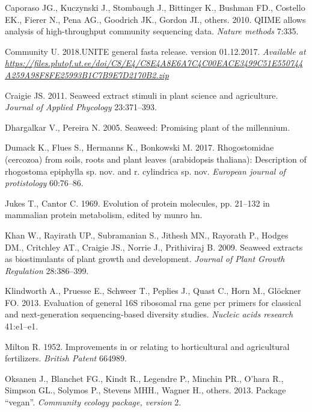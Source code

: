 \documentclass[11pt,]{article}
\begin{document}
\hypertarget{ref-caporaso2010qiime}{}
Caporaso JG., Kuczynski J., Stombaugh J., Bittinger K., Bushman FD.,
Costello EK., Fierer N., Pena AG., Goodrich JK., Gordon JI., others.
2010. QIIME allows analysis of high-throughput community sequencing
data. \emph{Nature methods} 7:335.

\hypertarget{ref-UNITE2017}{}
Community U. 2018.UNITE general fasta release. version 01.12.2017.
\emph{Available at}
\emph{\url{https://files.plutof.ut.ee/doi/C8/E4/C8E4A8E6A7C4C00EACE3499C51E550744A259A98F8FE25993B1C7B9E7D2170B2.zip}}

\hypertarget{ref-craigie2011seaweed}{}
Craigie JS. 2011. Seaweed extract stimuli in plant science and
agriculture. \emph{Journal of Applied Phycology} 23:371--393.

\hypertarget{ref-dhargalkar2005seaweed}{}
Dhargalkar V., Pereira N. 2005. Seaweed: Promising plant of the
millennium.

\hypertarget{ref-dumack2017rhogostomidae}{}
Dumack K., Flues S., Hermanns K., Bonkowski M. 2017. Rhogostomidae
(cercozoa) from soils, roots and plant leaves (arabidopsis thaliana):
Description of rhogostoma epiphylla sp. nov. and r. cylindrica sp. nov.
\emph{European journal of protistology} 60:76--86.

\hypertarget{ref-jukes1969evolution}{}
Jukes T., Cantor C. 1969. Evolution of protein molecules, pp. 21--132 in
mammalian protein metabolism, edited by munro hn.

\hypertarget{ref-khan2009seaweed}{}
Khan W., Rayirath UP., Subramanian S., Jithesh MN., Rayorath P., Hodges
DM., Critchley AT., Craigie JS., Norrie J., Prithiviraj B. 2009. Seaweed
extracts as biostimulants of plant growth and development. \emph{Journal
of Plant Growth Regulation} 28:386--399.

\hypertarget{ref-klindworth2013evaluation}{}
Klindworth A., Pruesse E., Schweer T., Peplies J., Quast C., Horn M.,
Glöckner FO. 2013. Evaluation of general 16S ribosomal rna gene pcr
primers for classical and next-generation sequencing-based diversity
studies. \emph{Nucleic acids research} 41:e1--e1.

\hypertarget{ref-milton1952improvements}{}
Milton R. 1952. Improvements in or relating to horticultural and
agricultural fertilizers. \emph{British Patent} 664989.

\hypertarget{ref-oksanen2013package}{}
Oksanen J., Blanchet FG., Kindt R., Legendre P., Minchin PR., O'hara R.,
Simpson GL., Solymos P., Stevens MHH., Wagner H., others. 2013. Package
``vegan''. \emph{Community ecology package, version} 2.
\end{document}
